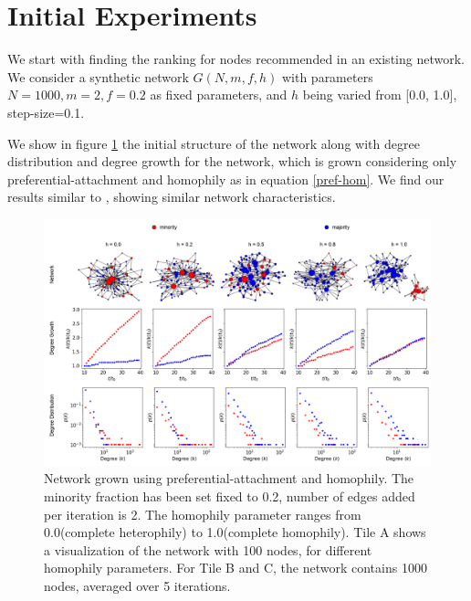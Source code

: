 \section{Initial Experiments}

We start with finding the ranking for nodes recommended in an existing network. We consider a synthetic network $G(N,m,f,h)$ with parameters $N=1000, m=2, f=0.2$ as fixed parameters, and $h$ being varied from [0.0, 1.0], step-size=0.1.

We show in figure \ref{fig-hom} the initial structure of the network along with degree distribution and degree growth for the network, which is grown considering only preferential-attachment and homophily as in equation \ref{pref-hom}. We find our results similar to \cite{karimi2018homophily}, showing similar network characteristics.

\begin{figure}[hbt!]
	\centering
	\includegraphics[scale=0.23]{images/proposal_figure_1}
	\caption{Network grown using preferential-attachment and homophily. The minority fraction has been set fixed to 0.2, number of edges added per iteration is 2. The homophily parameter ranges from 0.0(complete heterophily) to 1.0(complete homophily). Tile A shows a visualization of the network with 100 nodes, for different homophily parameters. For Tile B and C, the network contains 1000 nodes, averaged over 5 iterations.}
	\label{fig-hom}
\end{figure}

